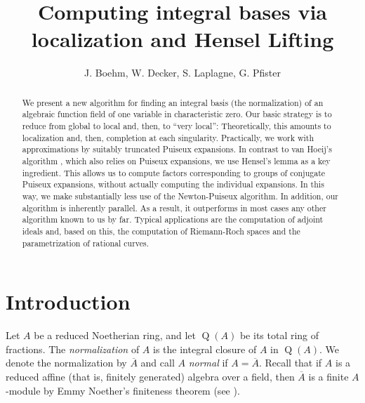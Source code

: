 \documentclass[a4paper,11pt]{amsart}%
\theoremstyle{definition}
\theoremstyle{plain}
\theoremstyle{remark}
\DeclareMathOperator{\TQR}{Q}
\begin{document}
\title[Integral bases via localization]{Computing integral bases via localization and Hensel Lifting}
\author{J. Boehm, W. Decker, S. Laplagne, G. Pfister}

\begin{abstract}
We present a new algorithm for finding an integral basis (the normalization)
of an algebraic function field of one variable in characteristic zero. 
Our basic strategy is to reduce from global to local and, then, to 
``very local'': Theoretically, this amounts to localization and, then, completion
at each singularity. Practically, we work with approximations by suitably
truncated Puiseux expansions. In contrast to van Hoeij's algorithm
\cite{vanHoeij94}, which also relies on Puiseux expansions, we use Hensel's
lemma as a key ingredient. This allows us to compute factors corresponding to
groups of conjugate Puiseux expansions, without actually computing the 
individual expansions. In this way, we make substantially less use of the Newton-Puiseux
algorithm. In addition, our algorithm is inherently parallel. As a result, it
outperforms in most cases any other algorithm known to us by far. Typical
applications are the computation of adjoint ideals and, based on this, the
computation of Riemann-Roch spaces and the parametrization of rational curves.

\end{abstract}
\maketitle


\section{Introduction}

\label{sect:intro} Let $A$ be a reduced Noetherian ring, and let $\TQR(A)$ be
its total ring of fractions. The {\emph{normalization}} of $A$ is the integral
closure of $A$ in $\TQR(A)$. We denote the normalization by $\overline{A}$ and
call $A$ {\emph{normal}} if $A=\overline{A}$. Recall that if $A$ is a reduced
affine (that is, finitely generated) algebra over a field, then $\overline{A}$
is a finite $A$-module by Emmy Noether's finiteness theorem (see \cite{SH}).
\end{document}

